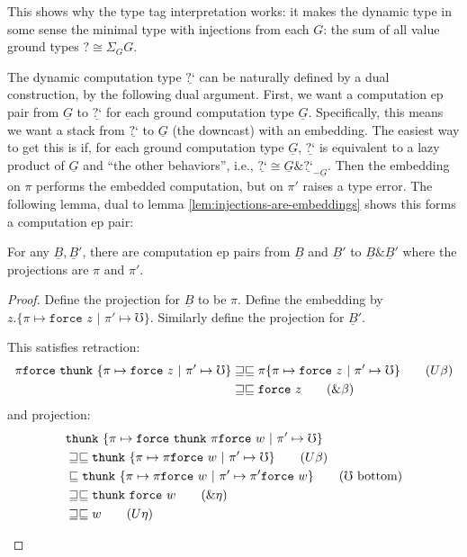 \documentclass[acmsmall,nonacm]{acmart}
\renewcommand{\u}{\underline}
\newcommand{\pipe}{\,\,|\,\,}
\newcommand{\ltdyn}{\sqsubseteq}
\newcommand{\gtdyn}{\sqsupseteq}
\newcommand{\equidyn}{\mathrel{\gtdyn\ltdyn}}
\newcommand{\pair}[2]{\{ \pi \mapsto {#1} \pipe \pi' \mapsto {#2}\}}
\newcommand{\dync}{\u {\text{?`}}}
\newcommand{\err}{\mho}
\newcommand{\kw}[1]{\texttt{#1}\,\,}
\newcommand{\thunk}{\kw{thunk}}
\newcommand{\force}{\kw{force}}
\newcommand{\with}{\mathbin{\&}}
\begin{document}
This shows why the type tag interpretation works: it makes the dynamic
type in some sense the minimal type with injections from each $G$:
the sum of all value ground types $? \cong \Sigma_{G} G$.

The dynamic computation type $\dync$ can be naturally defined by a
dual construction, by the following dual argument.
%
First, we want a computation ep pair from $\u G$ to $\dync$ for each
ground computation type $\u G$.
%
Specifically, this means we want a stack from $\dync$ to $\u G$ (the
downcast) with an embedding.
%
The easiest way to get this is if, for each ground computation type
$\u G$, $\dync$ is equivalent to a lazy product of $\u G$ and ``the
other behaviors'', i.e., $\dync \cong \u G \with \dync_{-\u G}$.
%
Then the embedding on $\pi$ performs the embedded computation, but on
$\pi'$ raises a type error.
%
The following lemma, dual to lemma \ref{lem:injections-are-embeddings}
shows this forms a computation ep pair:

\begin{lemma}\label{lem:projections-are-projections}
  For any $\u B, \u B'$, there are computation ep pairs from $\u B$
  and $\u B'$ to $\u B \with \u B'$ where the projections are $\pi$
  and $\pi'$.
\end{lemma}
\begin{proof}
  Define the projection for $\u B$ to be $\pi$. Define the embedding
  by $z. \pair{\force z}{\err}$. Similarly define the projection for
  $\u B'$.
  \begin{longonly}
    This satisfies retraction:
    \begin{align*}
      \pi\force\thunk\pair{\force z}{\err}
      &\equidyn \pi\pair{\force z}{\err}\tag{$U\beta$}\\
      &\equidyn \force z\tag{$\with\beta$}
    \end{align*}
    and projection:
    \begin{align*}
      &\thunk\pair{\force\thunk\pi\force w}{\err}\\
      &\equidyn \thunk\pair{\pi\force w}{\err} \tag{$U\beta$}\\
      &\ltdyn \thunk\pair{\pi\force w}{\pi'\force w}\tag{$\err$ bottom}\\
      &\equidyn \thunk\force w\tag{$\with\eta$}\\
      &\equidyn w \tag{$U\eta$}
    \end{align*}
  \end{longonly}
\end{proof}
\end{document}
